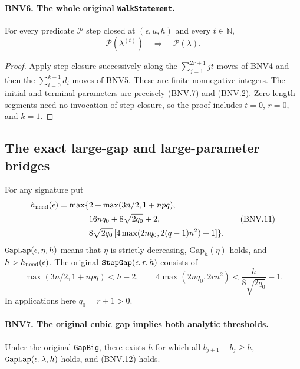 \documentclass[11pt,a4paper]{article}
\numberwithin{equation}{section}
\theoremstyle{remark}\newtheorem{remark}[theorem]{Remark}
\begin{document}
\paragraph{BNV6. The whole original \texttt{Walk\allowbreak Statement}.}
\label{claim:BNV6}
For every predicate $\mathcal P$ step closed at $(\epsilon,u,h)$ and
every $t\in\mathbb N$,
\[
 \mathcal P(\lambda^{(t)})\quad\Longrightarrow\quad\mathcal P(\lambda).
 \tag{BNV.10}
\]

\begin{proof}
Apply step closure successively along the $\sum_{j=1}^{2r+1}jt$ moves of
BNV4 and then the $\sum_{i=0}^{k-1}d_i$ moves of BNV5.  These are finite
nonnegative integers.  The initial and terminal parameters are precisely
(BNV.7) and (BNV.2).  Zero-length segments need no invocation of step
closure, so the proof includes $t=0$, $r=0$, and $k=1$.
\end{proof}

\subsection{The exact large-gap and large-parameter bridges}

For any signature put
\[
 \begin{split}
 h_{\rm need}(\epsilon)=\max\{&2+\max(3n/2,1+npq),\\
 &16nq_0+8\sqrt{2q_0}+2,\\
 &8\sqrt{2q_0}\,[4\max(2nq_0,2(q-1)n^2)+1]\}.
 \end{split}
 \tag{BNV.11}
\]
$\texttt{Gap\allowbreak Lap}(\epsilon,\eta,h)$ means that $\eta$ is strictly
decreasing, $\mathrm{Gap}_h(\eta)$ holds, and $h>h_{\rm need}(\epsilon)$.
The original $\texttt{Step\allowbreak Gap}(\epsilon,r,h)$ consists of
\[
 \max(3n/2,1+npq)<h-2,\qquad
 4\max(2nq_0,2rn^2)<\frac{h}{8\sqrt{2q_0}}-1.
 \tag{BNV.12}
\]
In applications here $q_0=r+1>0$.

\paragraph{BNV7. The original cubic gap implies both analytic thresholds.}
\label{claim:BNV7}
Under the original \texttt{Gap\allowbreak Big}, there exists $h$ for which all
$b_{j+1}-b_j\ge h$, $\texttt{Gap\allowbreak Lap}(\epsilon,\lambda,h)$ holds, and
(BNV.12) holds.
\end{document}
